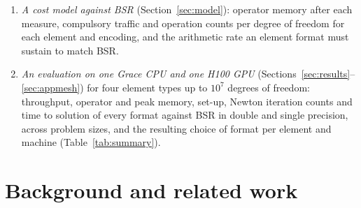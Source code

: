 \documentclass[sigconf,balance=false]{acmart}
\begin{document}
\begin{enumerate}[leftmargin=1.5em,itemsep=2pt]
  SELL-C-$\sigma$ layout applied without atomics, each on the CPU and the GPU.
\item \emph{A cost model against BSR} (Section~\ref{sec:model}): operator memory after each
  measure, compulsory traffic and operation counts per degree of freedom for each element and
  encoding, and the arithmetic rate an element format must sustain to match BSR.
\item \emph{An evaluation on one Grace CPU and one H100 GPU} (Sections~\ref{sec:results}--\ref{sec:appmesh}) for four
  element types up to $10^7$ degrees of freedom: throughput, operator and peak memory, set-up, Newton
  iteration counts and time to solution of every format against BSR in double and single precision,
  across problem sizes, and the resulting choice of format per element and machine
  (Table~\ref{tab:summary}).
\end{enumerate}

\section{Background and related work}
\label{sec:related}
\end{document}
